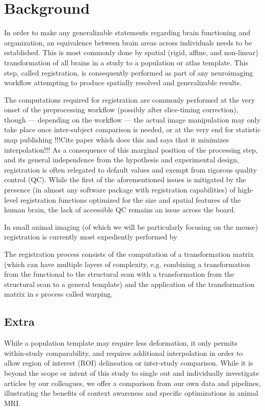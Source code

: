 \section{Background}

In order to make any generalizable statements regarding brain functioning and organization, an equivalence between brain areas across individuals needs to be established.
This is most commonly done by spatial (rigid, affine, and non-linear) transformation of all brains in a study to a population or atlas template.
This step, called registration, is consequently performed as part of any neuroimaging workflow attempting to produce spatially resolved and generalizable results.

The computations required for registration are commonly performed at the very onset of the preprocessing workflow (possibly after slice-timing correction),
though --- depending on the workflow --- the actual image manipulation may only take place once inter-subject comparison is needed, or at the very end for statistic map publishing !!!Cite paper which does this and says that it minimizes interpolation!!!
As a consequence of this marginal position of the processing step, and its general independence from the hypothesis and experimental design, registration is often relegated to default values and exempt from rigorous quality control (QC).
While the first of the aforementioned issues is mitigated by the presence (in almost any software package with registration capabilities) of high-level registration functions optimized for the size and spatial features of the human brain, the lack of accessible QC remains an issue across the board.

In small animal imaging (of which we will be particularly focusing on the mouse) registration is currently most expediently performed by 	

The registration process consists of the computation of a transformation matrix (which can have multiple layers of complexity, e.g. combining a transformation from the functional to the structural scan with a transformation from the structural scan to a general template) and the application of the transformation matrix in s process called warping.

	\subsection{Extra}
	While a population template may require less deformation, it only permits within-study comparability, and requires additional interpolation in order to allow region of interest (ROI) delineation or inter-study comparison.
	While it is beyond the scope or intent of this study to single out and individually investigate articles by our colleagues, we offer a comparison from our own data and pipelines, illustrating the benefits of context awareness and specific optimizations in animal MRI.
